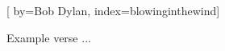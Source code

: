 
[%
    by={Bob Dylan},
    index={blowinginthewind}]


    \label{blowinginthewind}

    \beginverse
        Example verse ...
    \endverse
\endsong
